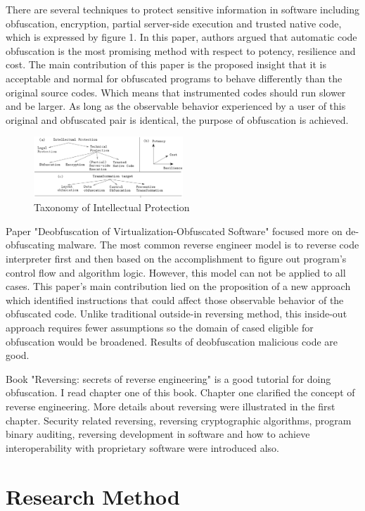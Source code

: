 \documentclass{sig-alternate-05-2015}
\begin{document}
There are several techniques to protect sensitive information in software including obfuscation, encryption, partial server-side execution and trusted native code\cite{Collberg:Ataxonomy}, which is expressed by figure 1. In this paper, authors argued that automatic code obfuscation is the most promising method with respect to potency, resilience and cost. The main contribution of this paper is the proposed insight that it is acceptable and normal for obfuscated programs to behave differently than the original source codes. Which means that instrumented codes should run slower and be larger. As long as the observable behavior experienced by a user of this original and obfuscated pair is identical, the purpose of obfuscation is achieved.
\begin{figure}
\centering
\includegraphics[width=0.5\textwidth]{taxnomy1}
\caption{Taxonomy of Intellectual Protection}
\end{figure}

Paper "Deobfuscation of Virtualization-Obfuscated Software"\cite{Coogan:Deobfuscation} focused more on de-obfuscating malware. The most common reverse engineer model is to reverse code interpreter first and then based on the accomplishment to figure out program's control flow and algorithm logic. However, this model can not be applied to all cases. This paper's main contribution lied on the proposition of a new approach which identified instructions that could affect those observable behavior of the obfuscated code. Unlike traditional outside-in reversing method, this inside-out approach requires fewer assumptions so the domain of cased eligible for obfuscation would be broadened. Results of deobfuscation malicious code are good.

Book "Reversing: secrets of reverse engineering"\cite{Eilam:Reversing} is a good tutorial for doing obfuscation. I read chapter one of this book. Chapter one clarified the concept of reverse engineering. More details about reversing were illustrated in the first chapter. Security related reversing, reversing cryptographic algorithms, program binary auditing, reversing development in software and how to achieve interoperability with proprietary software were introduced also.	
\section{Research Method}
\end{document}
